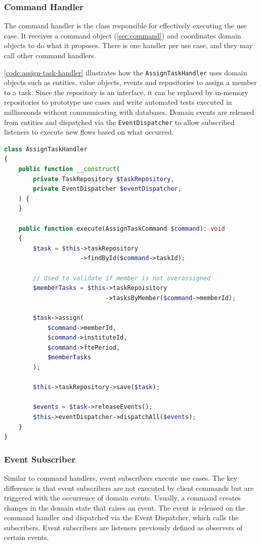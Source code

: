 \subsubsection{Command Handler}
\label{sec:command-handler}

The command handler is the class responsible for effectively executing the use case. It receives a command object (\autoref{sec:command}) and coordinates domain objects to do what it proposes. There is one handler per use case, and they may call other command handlers.

\autoref{code:assign-task-handler} illustrates how the \texttt{AssignTaskHandler} uses domain objects such as entities, value objects, events and repositories to assign a member to a task. Since the repository is an interface, it can be replaced by in-memory repositories to prototype use cases and write automated tests executed in milliseconds without communicating with databases. Domain events are released from entities and dispatched via the \texttt{EventDispatcher} to allow subscribed listeners to execute new flows based on what occurred.

\begin{lstlisting}[language=PHP,label={code:assign-task-handler},caption={Example of the \texttt{AssignTask} command handler.}]
class AssignTaskHandler
{
	public function __construct(
		private TaskRepository $taskRepository,
		private EventDispatcher $eventDispatcher,
	) {
	}

	public function execute(AssignTaskCommand $command): void
	{
		$task = $this->taskRepository
                     ->findById($command->taskId);

		// Used to validate if member is not overassigned
		$memberTasks = $this->taskRepoisitory
                            ->tasksByMember($command->memberId);
		
		$task->assign(
			$command->memberId,
			$command->instituteId,
			$command->ftePeriod,
			$memberTasks
		);

		$this->taskRepository->save($task);

		$events = $task->releaseEvents();
		$this->eventDispatcher->dispatchAll($events);
	}
}
\end{lstlisting}

\subsubsection{Event Subscriber}

Similar to command handlers, event subscribers execute use cases. The key difference is that event subscribers are not executed by client commands but are triggered with the occurrence of domain events. Usually, a command creates changes in the domain state that raises an event. The event is released on the command handler and dispatched via the Event Dispatcher, which calls the subscribers. Event subscribers are listeners previously defined as observers of certain events.

